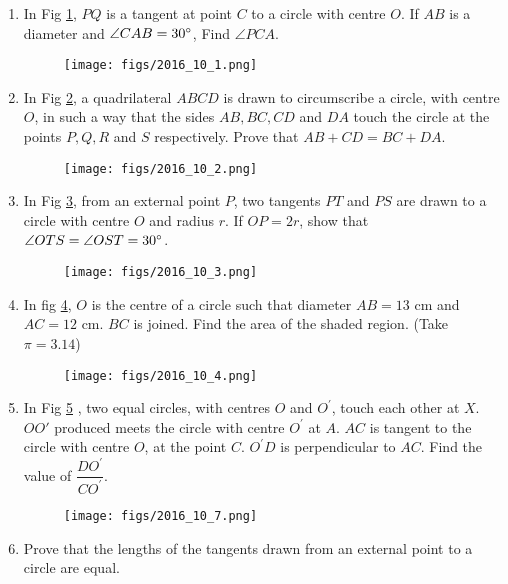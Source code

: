 \begin{enumerate}
\item In Fig \ref{figure_2}, $PQ$ is a tangent at point $C$ to a circle with centre $O$. If $AB$ is a diameter and $\angle CAB = 30\degree $, Find $\angle PCA$.\\
\begin{figure}[H]
\centering
	\texttt{[image: figs/2016\_10\_1.png]}
	\caption{}
\label{figure_2}
\end{figure} 
\item  In Fig \ref{figure_3}, a quadrilateral $ABCD$ is drawn to circumscribe a circle, with centre $O$, in such a way that the sides $AB, BC, CD$ and $DA$ touch the circle at the points $P, Q, R$ and $S$ respectively. Prove that $ AB + CD= BC + DA $.\\
	\begin{figure}[H]
\centering
      \texttt{[image: figs/2016\_10\_2.png]}
      \caption{}
      \label{figure_3}
\end{figure} 
\item  In Fig \ref{figure_4}, from an external point $P$, two tangents $PT$ and $PS$ are drawn to a circle with centre $O$ and radius $r$. If $OP = 2r$, show that $\angle OTS = \angle OST= 30\degree$.
\begin{figure}[H]
\centering
\texttt{[image: figs/2016\_10\_3.png]}
\caption{}
      \label{figure_4}
   \end{figure} 
 \item  In fig \ref{figure_5}, $O$ is the centre of a circle such that diameter $AB = 13$ cm and $AC = 12$ cm. $BC$ is joined. Find the area of the shaded region. (Take $\pi = 3.14$)\\

	\begin{figure}[H]
      \centering
      \texttt{[image: figs/2016\_10\_4.png]}
      \caption{}
      \label{figure_5}
\end{figure} 
\item In Fig \ref{figure_6} , two equal circles, with centres $O$ and $O^\prime$, touch each other at $X$.$OO\prime$ produced meets the circle with centre $O^\prime$ at $A$. $AC$ is tangent to the circle with centre $O$, at the point $C$. $O^\prime D$ is perpendicular to $AC$. Find the value of $\dfrac{DO^\prime}{CO^\prime}$.\\
	\begin{figure}[H]
      \centering
      \texttt{[image: figs/2016\_10\_7.png]}
      \caption{}
      \label{figure_6}
   \end{figure} 
 
\item Prove that the lengths of the tangents drawn from an external point to a circle are equal.
\end{enumerate}
